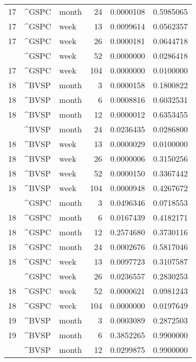 \begin{tabular}{rllrrr}
17 & \textasciicircum{}GSPC & month & 24 & 0.0000108 & 0.5985065\\
17 & \textasciicircum{}GSPC & week & 13 & 0.0099614 & 0.0562357\\
17 & \textasciicircum{}GSPC & week & 26 & 0.0000181 & 0.0644718\\
\addlinespace
17 & \textasciicircum{}GSPC & week & 52 & 0.0000000 & 0.0286418\\
17 & \textasciicircum{}GSPC & week & 104 & 0.0000000 & 0.0100000\\
18 & \textasciicircum{}BVSP & month & 3 & 0.0000158 & 0.1800822\\
18 & \textasciicircum{}BVSP & month & 6 & 0.0008816 & 0.6032531\\
18 & \textasciicircum{}BVSP & month & 12 & 0.0000012 & 0.6353455\\
\addlinespace
18 & \textasciicircum{}BVSP & month & 24 & 0.0236435 & 0.0286800\\
18 & \textasciicircum{}BVSP & week & 13 & 0.0000029 & 0.0100000\\
18 & \textasciicircum{}BVSP & week & 26 & 0.0000006 & 0.3150256\\
18 & \textasciicircum{}BVSP & week & 52 & 0.0000150 & 0.3367442\\
18 & \textasciicircum{}BVSP & week & 104 & 0.0000948 & 0.4267672\\
\addlinespace
18 & \textasciicircum{}GSPC & month & 3 & 0.0496346 & 0.0718553\\
18 & \textasciicircum{}GSPC & month & 6 & 0.0167439 & 0.4182171\\
18 & \textasciicircum{}GSPC & month & 12 & 0.2574680 & 0.3730116\\
18 & \textasciicircum{}GSPC & month & 24 & 0.0002676 & 0.5817046\\
18 & \textasciicircum{}GSPC & week & 13 & 0.0097723 & 0.3107587\\
\addlinespace
18 & \textasciicircum{}GSPC & week & 26 & 0.0236557 & 0.2830253\\
18 & \textasciicircum{}GSPC & week & 52 & 0.0000621 & 0.0981243\\
18 & \textasciicircum{}GSPC & week & 104 & 0.0000000 & 0.0197649\\
19 & \textasciicircum{}BVSP & month & 3 & 0.0003089 & 0.2872503\\
19 & \textasciicircum{}BVSP & month & 6 & 0.3852265 & 0.9900000\\
\addlinespace
19 & \textasciicircum{}BVSP & month & 12 & 0.0299875 & 0.9900000\\

\end{tabular}
